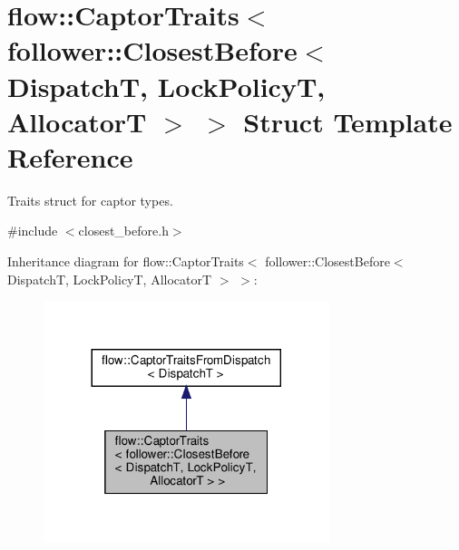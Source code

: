 \hypertarget{structflow_1_1_captor_traits_3_01follower_1_1_closest_before_3_01_dispatch_t_00_01_lock_policy_t_00_01_allocator_t_01_4_01_4}{}\section{flow\+:\+:Captor\+Traits$<$ follower\+:\+:Closest\+Before$<$ DispatchT, Lock\+PolicyT, AllocatorT $>$ $>$ Struct Template Reference}
\label{structflow_1_1_captor_traits_3_01follower_1_1_closest_before_3_01_dispatch_t_00_01_lock_policy_t_00_01_allocator_t_01_4_01_4}


Traits struct for captor types.  




{\ttfamily \#include $<$closest\+\_\+before.\+h$>$}



Inheritance diagram for flow\+:\+:Captor\+Traits$<$ follower\+:\+:Closest\+Before$<$ DispatchT, Lock\+PolicyT, AllocatorT $>$ $>$\+:\nopagebreak
\begin{figure}[H]
\begin{center}
\leavevmode
\includegraphics[width=236pt]{structflow_1_1_captor_traits_3_01follower_1_1_closest_before_3_01_dispatch_t_00_01_lock_policy_t9731568ca1e529ffb7a2335c9c8bd223}
\end{center}
\end{figure}


